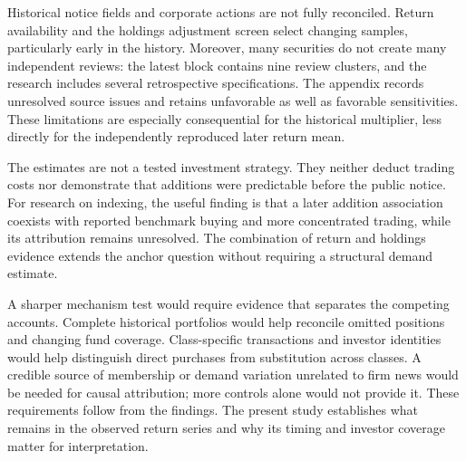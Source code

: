 Historical notice fields and corporate actions are not fully reconciled. Return availability and the holdings adjustment screen select changing samples, particularly early in the history. Moreover, many securities do not create many independent reviews: the latest block contains nine review clusters, and the research includes several retrospective specifications. The appendix records unresolved source issues and retains unfavorable as well as favorable sensitivities. These limitations are especially consequential for the historical multiplier, less directly for the independently reproduced later return mean.

The estimates are not a tested investment strategy. They neither deduct trading costs nor demonstrate that additions were predictable before the public notice. For research on indexing, the useful finding is that a later addition association coexists with reported benchmark buying and more concentrated trading, while its attribution remains unresolved. The combination of return and holdings evidence extends the anchor question without requiring a structural demand estimate.

A sharper mechanism test would require evidence that separates the competing accounts. Complete historical portfolios would help reconcile omitted positions and changing fund coverage. Class-specific transactions and investor identities would help distinguish direct purchases from substitution across classes. A credible source of membership or demand variation unrelated to firm news would be needed for causal attribution; more controls alone would not provide it. These requirements follow from the findings. The present study establishes what remains in the observed return series and why its timing and investor coverage matter for interpretation.
\FloatBarrier
